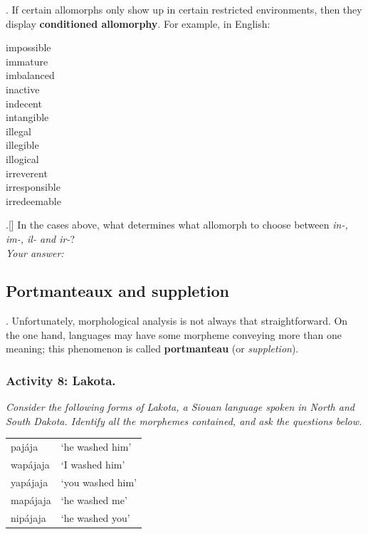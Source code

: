 \documentclass[11pt, oneside]{article}   	%
\begin{document}

\ex. If certain allomorphs only show up in certain restricted environments, then they display {\bfseries conditioned allomorphy}. For example, in English: 

\begin{multicols}{3}
\centering
\noindent impossible \\ 
immature \\
imbalanced \\
inactive \\
\columnbreak
indecent \\
intangible \\
illegal \\
illegible \\
\columnbreak
illogical \\
irreverent \\
irresponsible \\
irredeemable \\
\end{multicols}

\ex.[] In the cases above, what determines what allomorph to choose between {\itshape in-, im-, il- and ir-}? \\

{\it Your answer:} 
\vspace{1cm}


\subsection{Portmanteaux and suppletion}

\ex. Unfortunately, morphological analysis is not always that straightforward. On the one hand, languages may have some morpheme conveying more than one meaning; this phenomenon is called {\bfseries portmanteau} (or {\itshape suppletion}). %

\subsubsection{Activity 8: Lakota.}

{\itshape Consider the following forms of Lakota, a Siouan language spoken in North and South Dakota. Identify all the morphemes contained, and ask the questions below.}

\vspace{0.2cm}

\begin{tabular}{l l}
pajája &	`he washed him' \\
wapájaja &	`I washed him' \\
yapájaja &	`you washed him' \\
mapájaja &	`he washed me' \\
nipájaja &	`he washed you' \\
\end{tabular}
\end{document}
